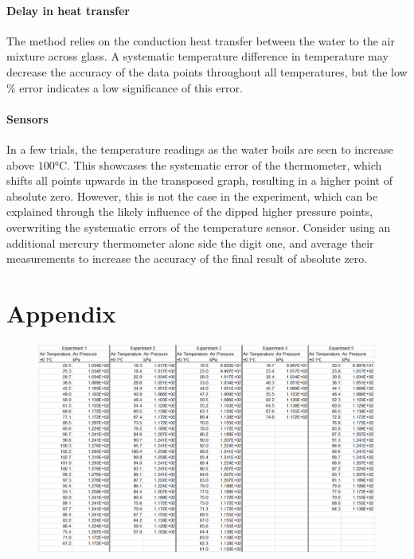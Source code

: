 \documentclass[a4paper,12pt]{article}
\begin{document}
\paragraph{Delay in heat transfer}
The method relies on the conduction heat transfer between the water to the air mixture across glass. A systematic temperature difference in temperature may decrease the accuracy of the data points throughout all temperatures, but the low \% error indicates a low significance of this error.

\paragraph{Sensors}
In a few trials, the temperature readings as the water boils are seen to increase above $100\si{\celsius}$. This showcases the systematic error of the thermometer, which shifts all points upwards in the transposed graph, resulting in a higher point of absolute zero. However, this is not the case in the experiment, which can be explained through the likely influence of the dipped higher pressure points, overwriting the systematic errors of the temperature sensor. Consider using an additional mercury thermometer alone side the digit one, and average their measurements to increase the accuracy of the final result of absolute zero.

\newpage
\nocite{*}
\printbibliography


\newpage
\section*{Appendix}
\appendix
\begin{figure}[H]
    \centering
    \includegraphics[width=\textwidth]{assets/unitdata.png}
    \label{fig:pq}
\end{figure}
\end{document}

